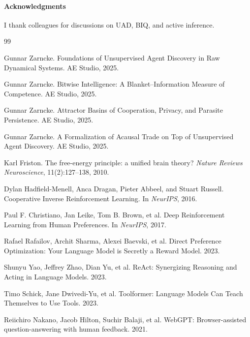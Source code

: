 \documentclass[11pt]{article}
\begin{document}
\paragraph{Acknowledgments} I thank colleagues for discussions on UAD, B\textendash IQ, and active inference.


\begin{thebibliography}{99}

Gunnar Zarncke. Foundations of Unsupervised Agent Discovery in Raw Dynamical Systems. AE Studio, 2025.

Gunnar Zarncke. Bitwise Intelligence: A Blanket--Information Measure of Competence. AE Studio, 2025.

Gunnar Zarncke. Attractor Basins of Cooperation, Privacy, and Parasite Persistence. AE Studio, 2025.

Gunnar Zarncke. A Formalization of Acausal Trade on Top of Unsupervised Agent Discovery. AE Studio, 2025.

Karl Friston. The free-energy principle: a unified brain theory? \emph{Nature Reviews Neuroscience}, 11(2):127--138, 2010.

Dylan Hadfield-Menell, Anca Dragan, Pieter Abbeel, and Stuart Russell. Cooperative Inverse Reinforcement Learning. In \emph{NeurIPS}, 2016.

Paul F. Christiano, Jan Leike, Tom B. Brown, et al. Deep Reinforcement Learning from Human Preferences. In \emph{NeurIPS}, 2017.

Rafael Rafailov, Archit Sharma, Alexei Baevski, et al. Direct Preference Optimization: Your Language Model is Secretly a Reward Model. 2023.

Shunyu Yao, Jeffrey Zhao, Dian Yu, et al. ReAct: Synergizing Reasoning and Acting in Language Models. 2023.

Timo Schick, Jane Dwivedi-Yu, et al. Toolformer: Language Models Can Teach Themselves to Use Tools. 2023.

Reiichiro Nakano, Jacob Hilton, Suchir Balaji, et al. WebGPT: Browser-assisted question-answering with human feedback. 2021.


\end{thebibliography}
\end{document}
